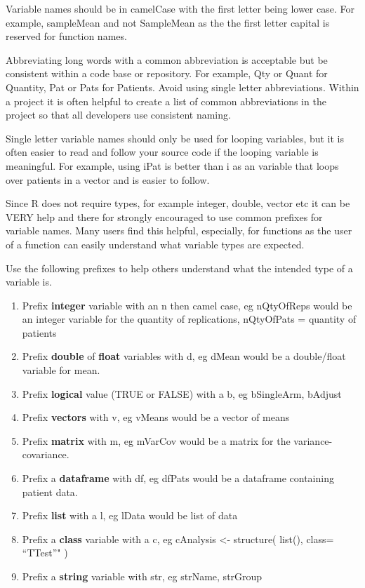 \documentclass[
]{book}
\providecommand{\tightlist}{%
  \setlength{\itemsep}{0pt}\setlength{\parskip}{0pt}}
\begin{document}
Variable names should be in camelCase with the first letter being lower case. For example, sampleMean and not SampleMean as the the first letter capital is reserved for function names.

Abbreviating long words with a common abbreviation is acceptable but be consistent within a code base or repository. For example, Qty or Quant for Quantity, Pat or Pats for Patients. Avoid using single letter abbreviations. Within a project it is often helpful to create a list of common abbreviations in the project so that all developers use consistent naming.

Single letter variable names should only be used for looping variables, but it is often easier to read and follow your source code if the looping variable is meaningful. For example, using iPat is better than i as an variable that loops over patients in a vector and is easier to follow.

Since R does not require types, for example integer, double, vector etc it can be VERY help and there for strongly encouraged to use common prefixes for variable names. Many users find this helpful, especially, for functions as the user of a function can easily understand what variable types are expected.

Use the following prefixes to help others understand what the intended type of a variable is.

\begin{enumerate}
\def\labelenumi{\arabic{enumi}.}
\tightlist
\item
  Prefix \textbf{integer} variable with an n then camel case, eg nQtyOfReps would be an integer variable for the quantity of replications, nQtyOfPats = quantity of patients
\item
  Prefix \textbf{double} of \textbf{float} variables with d, eg dMean would be a double/float variable for mean.
\item
  Prefix \textbf{logical} value (TRUE or FALSE) with a b, eg bSingleArm, bAdjust
\item
  Prefix \textbf{vectors} with v, eg vMeans would be a vector of means
\item
  Prefix \textbf{matrix} with m, eg mVarCov would be a matrix for the variance-covariance.
\item
  Prefix a \textbf{dataframe} with df, eg dfPats would be a dataframe containing patient data.
\item
  Prefix \textbf{list} with a l, eg lData would be list of data
\item
  Prefix a \textbf{class} variable with a c, eg cAnalysis \textless- structure( list(), class= ``TTest''" )
\item
  Prefix a \textbf{string} variable with str, eg strName, strGroup
\end{enumerate}
\end{document}
